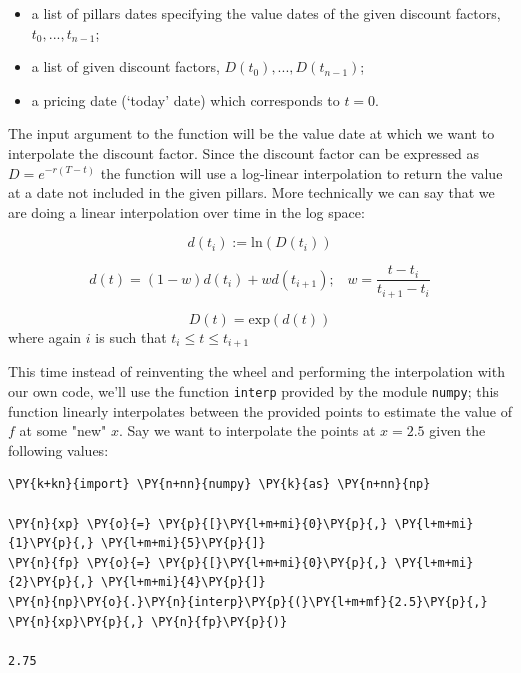 \begin{itemize}
\tightlist
\item a list of pillars dates specifying the value dates of the given discount factors, \(t_0,...,t_{n-1}\);
\item a list of given discount factors, \(D(t_0),...,D(t_{n-1})\);
\item a pricing date (`today' date) which corresponds to \(t=0\).
\end{itemize}

The input argument to the function will be the value date at which we want to interpolate the discount factor. Since the discount factor can be expressed as \(D=e^{-r(T-t)}\) the function will use a log-linear interpolation to return the value at a date not included in the given pillars.
More technically we can say that we are doing a linear interpolation over time in the log space:

\[d(t_i):=\mathrm{ln}(D(t_i))\]

\[d(t) = (1-w)d(t_i) + wd(t_{i+1});\;\;\;w=\frac{t-t_i}{t_{i+1}-t_i}\]

\[D(t) = \mathrm{exp}(d(t))\]
where again \(i\) is such that \(t_i \le t \le t_{i+1}\)

This time instead of reinventing the wheel and performing the interpolation with our own code, we'll use the function \texttt{interp} provided by the module \texttt{numpy}; this function linearly interpolates between the provided points to estimate the value of $f$ at some "new" $x$.
Say we want to interpolate the points at $x = 2.5$ given the following values:

\begin{tcolorbox}[breakable, size=fbox, boxrule=1pt, pad at break*=1mm,colback=cellbackground, colframe=cellborder]
\begin{Verbatim}[commandchars=\\\{\}]
\PY{k+kn}{import} \PY{n+nn}{numpy} \PY{k}{as} \PY{n+nn}{np}

\PY{n}{xp} \PY{o}{=} \PY{p}{[}\PY{l+m+mi}{0}\PY{p}{,} \PY{l+m+mi}{1}\PY{p}{,} \PY{l+m+mi}{5}\PY{p}{]}
\PY{n}{fp} \PY{o}{=} \PY{p}{[}\PY{l+m+mi}{0}\PY{p}{,} \PY{l+m+mi}{2}\PY{p}{,} \PY{l+m+mi}{4}\PY{p}{]}
\PY{n}{np}\PY{o}{.}\PY{n}{interp}\PY{p}{(}\PY{l+m+mf}{2.5}\PY{p}{,} \PY{n}{xp}\PY{p}{,} \PY{n}{fp}\PY{p}{)}

2.75
\end{Verbatim}
\end{tcolorbox}

